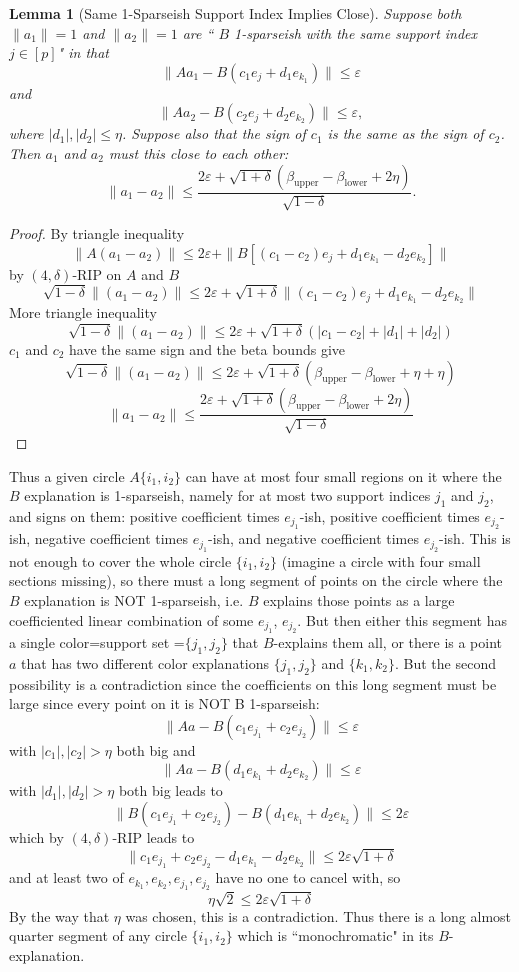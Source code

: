 \documentclass[11pt]{amsart}
\newtheorem{lemma}{Lemma}
\begin{document}
\begin{lemma}[Same 1-Sparseish Support Index Implies Close]
Suppose both $\|a_1\|=1$ and $\|a_2\|=1$  are `` $B$ 1-sparseish with the same support index $j\in [p]$" in that 
\[\|Aa_1 - B(c_1e_{j}+d_1 e_{k_1})\|\leq \varepsilon \]   and
\[\|Aa_2 - B(c_2e_{j}+d_2 e_{k_2})\|\leq \varepsilon,\]
where  $|d_1|, |d_2| \leq \eta$.
Suppose also that the sign of $c_1$ is the same as the sign of $c_2$.
Then $a_1$ and $a_2$ must this close to each other:
\[\|a_1-a_2\|\leq   \frac{2 \varepsilon + \sqrt{1+\delta} \left(\beta_\text{upper}-\beta_\text{lower} +2\eta\right)}{\sqrt{1-\delta}}.\]  
\end{lemma}
\begin{proof}
By triangle inequality
\[\|A(a_1-a_2)\|\leq  2\varepsilon + \|B[(c_1-c_2)e_{j}+d_1e_{k_1}-d_2e_{k_2}]\| \] 
by $(4,\delta)$-RIP on $A$ and $B$
\[\sqrt{1-\delta}\|(a_1-a_2)\|\leq  2\varepsilon + \sqrt{1+\delta} \|(c_1-c_2)e_{j}+d_1e_{k_1}-d_2e_{k_2}\| \] 
More triangle inequality
\[\sqrt{1-\delta}\|(a_1-a_2)\|\leq  2\varepsilon + \sqrt{1+\delta} \left(|c_1-c_2|+|d_1|+ |d_2|\right) \] 
$c_1$ and $c_2$ have the same sign and the beta bounds give
\[\sqrt{1-\delta}\|(a_1-a_2)\|\leq  2\varepsilon + \sqrt{1+\delta} \left(\beta_\text{upper}-\beta_\text{lower}+\eta+ \eta \right) \] 
\[\|a_1-a_2\|\leq   \frac{2 \varepsilon + \sqrt{1+\delta} \left(\beta_\text{upper}-\beta_\text{lower} +2\eta\right)}{\sqrt{1-\delta}} \] 
\end{proof}
Thus a given circle $A\{i_1,i_2\}$ can have at most four small regions on it where the $B$ explanation is 1-sparseish, namely
for at most two support indices $j_1$ and $j_2$, and signs on them: positive coefficient times $e_{j_1}$-ish,
positive coefficient times $e_{j_2}$-ish, negative coefficient times $e_{j_1}$-ish, and negative coefficient times $e_{j_2}$-ish.
This is not enough to cover the whole circle $\{i_1,i_2\}$ (imagine a circle with four small sections missing),
so there must a long segment of points on the circle where the $B$ explanation is NOT 1-sparseish, i.e. $B$ explains those points
as a large coefficiented linear combination of some $e_{j_1}$, $e_{j_2}$.  But then either this segment has a 
single color=support set =$\{j_1,j_2\}$ that $B$-explains them all, or there is a point $a$ that has two different color explanations
$\{j_1,j_2\}$ and $\{k_1,k_2\}$.
But the second possibility is a contradiction since the coefficients on this long segment must be large since every point on it is
NOT B 1-sparseish:
\[\|Aa - B(c_1e_{j_1}+c_2 e_{j_2})\|\leq \varepsilon \]
with $|c_1|,|c_2|>\eta$ both big and 
\[\|Aa - B(d_1e_{k_1}+d_2 e_{k_2})\|\leq \varepsilon \]
with $|d_1|,|d_2|>\eta$ both big leads to
 \[\| B(c_1e_{j_1}+c_2 e_{j_2}) - B(d_1e_{k_1}+d_2 e_{k_2})\|\leq 2\varepsilon \]
which by $(4,\delta)$-RIP leads to
\[\| c_1e_{j_1}+c_2 e_{j_2} - d_1e_{k_1}-d_2 e_{k_2}\|\leq 2\varepsilon\sqrt{1+\delta} \]
and at least two of $e_{k_1},e_{k_2},e_{j_1},e_{j_2}$ have no one to cancel with, so 
\[\eta \sqrt{2}\leq 2\varepsilon\sqrt{1+\delta} \]
By the way that $\eta$ was chosen, this is a contradiction.
Thus there is a long almost quarter segment of any circle $\{i_1,i_2\}$ which is ``monochromatic" in its $B$-explanation.   
\end{document}
